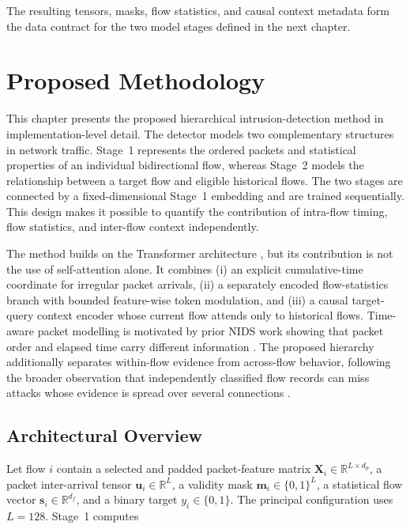 \documentclass[11pt,fleqn]{report}
\begin{document}
The resulting tensors, masks, flow statistics, and causal context metadata form
the data contract for the two model stages defined in the next chapter.

\providecommand{\methodfield}[1]{\texttt{\detokenize{#1}}}

\chapter{Proposed Methodology}
\label{sec:proposed_methodology}

This chapter presents the proposed hierarchical intrusion-detection method in
implementation-level detail. The detector models two complementary structures
in network traffic. Stage~1 represents the ordered packets and statistical
properties of an individual bidirectional flow, whereas Stage~2 models the
relationship between a target flow and eligible historical flows. The two
stages are connected by a fixed-dimensional Stage~1 embedding and are trained
sequentially. This design makes it possible to quantify the contribution of
intra-flow timing, flow statistics, and inter-flow context independently.

The method builds on the Transformer architecture \cite{Vaswani2017}, but its
contribution is not the use of self-attention alone. It combines (i) an explicit
cumulative-time coordinate for irregular packet arrivals, (ii) a separately
encoded flow-statistics branch with bounded feature-wise token modulation, and
(iii) a causal target-query context encoder whose current flow attends only to
historical flows. Time-aware packet modelling is motivated by prior NIDS work
showing that packet order and elapsed time carry different information
\cite{Han2023GTID}. The proposed hierarchy additionally separates within-flow
evidence from across-flow behavior, following the broader observation that
independently classified flow records can miss attacks whose evidence is spread
over several connections
\cite{LiuPatras2022NetSentry,Manocchio2024FlowTransformer,
MartinReizabal2026FlowWindow}.

\section{Architectural Overview}
\label{subsec:method_architecture}

Let flow $i$ contain a selected and padded packet-feature matrix
$\mathbf{X}_i\in\mathbb{R}^{L\times d_p}$, a packet inter-arrival tensor
$\mathbf{u}_i\in\mathbb{R}^{L}$, a validity mask
$\mathbf{m}_i\in\{0,1\}^{L}$, a statistical flow vector
$\mathbf{s}_i\in\mathbb{R}^{d_f}$, and a binary target
$y_i\in\{0,1\}$. The principal configuration uses $L=128$. Stage~1 computes
\end{document}
